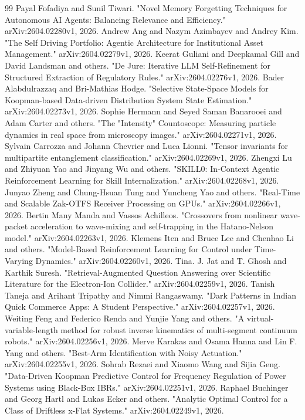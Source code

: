 \documentclass[11pt,a4paper]{article}
\begin{document}
\begin{thebibliography}{99}
 Payal Fofadiya and Sunil Tiwari. "Novel Memory Forgetting Techniques for Autonomous AI Agents: Balancing Relevance and Efficiency." arXiv:2604.02280v1, 2026.
 Andrew Ang and Nazym Azimbayev and Andrey Kim. "The Self Driving Portfolio: Agentic Architecture for Institutional Asset Management." arXiv:2604.02279v1, 2026.
 Keerat Guliani and Deepkamal Gill and David Landsman and others. "De Jure: Iterative LLM Self-Refinement for Structured Extraction of Regulatory Rules." arXiv:2604.02276v1, 2026.
 Bader Alabdulrazzaq and Bri-Mathias Hodge. "Selective State-Space Models for Koopman-based Data-driven Distribution System State Estimation." arXiv:2604.02273v1, 2026.
 Sophie Hermann and Seyed Saman Banarooei and Adam Carter and others. "The "Intensity" Countoscope: Measuring particle dynamics in real space from microscopy images." arXiv:2604.02271v1, 2026.
 Sylvain Carrozza and Johann Chevrier and Luca Lionni. "Tensor invariants for multipartite entanglement classification." arXiv:2604.02269v1, 2026.
 Zhengxi Lu and Zhiyuan Yao and Jinyang Wu and others. "SKILL0: In-Context Agentic Reinforcement Learning for Skill Internalization." arXiv:2604.02268v1, 2026.
 Junyao Zheng and Chung-Hsuan Tung and Yuncheng Yao and others. "Real-Time and Scalable Zak-OTFS Receiver Processing on GPUs." arXiv:2604.02266v1, 2026.
 Bertin Many Manda and Vassos Achilleos. "Crossovers from nonlinear wave-packet acceleration to wave-mixing and self-trapping in the Hatano-Nelson model." arXiv:2604.02263v1, 2026.
 Klemens Iten and Bruce Lee and Chenhao Li and others. "Model-Based Reinforcement Learning for Control under Time-Varying Dynamics." arXiv:2604.02260v1, 2026.
 Tina. J. Jat and T. Ghosh and Karthik Suresh. "Retrieval-Augmented Question Answering over Scientific Literature for the Electron-Ion Collider." arXiv:2604.02259v1, 2026.
 Tanish Taneja and Arihant Tripathy and Nimmi Rangaswamy. "Dark Patterns in Indian Quick Commerce Apps: A Student Perspective." arXiv:2604.02257v1, 2026.
 Weiting Feng and Federico Renda and Yunjie Yang and others. "A virtual-variable-length method for robust inverse kinematics of multi-segment continuum robots." arXiv:2604.02256v1, 2026.
 Merve Karakas and Osama Hanna and Lin F. Yang and others. "Best-Arm Identification with Noisy Actuation." arXiv:2604.02255v1, 2026.
 Sohrab Rezaei and Xiaomo Wang and Sijia Geng. "Data-Driven Koopman Predictive Control for Frequency Regulation of Power Systems using Black-Box IBRs." arXiv:2604.02251v1, 2026.
 Raphael Buchinger and Georg Hartl and Lukas Ecker and others. "Analytic Optimal Control for a Class of Driftless x-Flat Systems." arXiv:2604.02249v1, 2026.

\end{thebibliography}
\end{document}
